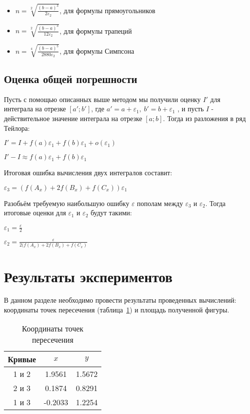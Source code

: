 \documentclass[a4paper,12pt,titlepage,finall]{article}
\begin{document}
\begin{itemize}
  \item $ n = \sqrt[2]{\frac{(b-a)^3}{2\varepsilon_2}}$, для формулы прямоугольников

  \item $ n = \sqrt[2]{\frac{(b-a)^3}{12\varepsilon_2}}$, для формулы трапеций

  \item $ n = \sqrt[4]{\frac{(b-a)^5}{2880\varepsilon_2}}$, для формулы Симпсона
\end{itemize}

\subsection{Оценка общей погрешности}
Пусть с помощью описанных выше методом мы получили оценку $I'$ для интеграла
на отрезке $[a';b']$, где 
$a' = a + \varepsilon_1,~b'=b+\varepsilon_1$
, и пусть $I$ - действительное значение интеграла на отрезке $[a;b]$. 
Тогда из разложения в ряд Тейлора:

$I' = I + f(a)\varepsilon_1 + f(b)\varepsilon_1 + o(\varepsilon_1)$

$I' - I \approx f(a)\varepsilon_1 + f(b)\varepsilon_1$

Итоговая ошибка вычисления двух интегралов составит:

$\varepsilon_3 = (f(A_x) + 2f(B_x) + f(C_x))\varepsilon_1$

Разобьём требуемую наибольшую ошибку $\varepsilon$ пополам между $\varepsilon_3$ и $\varepsilon_2$. Тогда итоговые оценки для $\varepsilon_1$ и $\varepsilon_2$ будут такими:

$\varepsilon_1 = \frac{\varepsilon}{2}$

$\varepsilon_2 = \frac{\varepsilon}{2(f(A_x) + 2f(B_x) + f(C_x)}$

\newpage

\section{Результаты экспериментов}

В данном разделе необходимо провести результаты проведенных вычислений:
координаты точек пересечения (таблица~\ref{table1}) и площадь полученной фигуры.

\begin{table}[h]
\centering
\begin{tabular}{|c|c|c|}
\hline
Кривые & $x$ & $y$ \\
\hline
1 и 2 &  1.9561 & 1.5672 \\
2 и 3 &  0.1874 & 0.8291 \\
1 и 3 & -0.2033 & 1.2254 \\
\hline
\end{tabular}
\caption{Координаты точек пересечения}
\label{table1}
\end{table}
\end{document}
